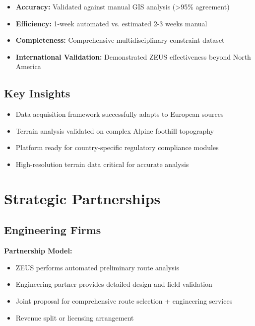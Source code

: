 \documentclass[11pt,letterpaper]{article}
\begin{document}
\begin{itemize}[leftmargin=*]
    \item \textbf{Accuracy:} Validated against manual GIS analysis (>95\% agreement)
    \item \textbf{Efficiency:} 1-week automated vs. estimated 2-3 weeks manual
    \item \textbf{Completeness:} Comprehensive multidisciplinary constraint dataset
    \item \textbf{International Validation:} Demonstrated ZEUS effectiveness beyond North America
\end{itemize}

\subsection{Key Insights}

\begin{itemize}[leftmargin=*]
    \item Data acquisition framework successfully adapts to European sources
    \item Terrain analysis validated on complex Alpine foothill topography
    \item Platform ready for country-specific regulatory compliance modules
    \item High-resolution terrain data critical for accurate analysis
\end{itemize}

\newpage

\section{Strategic Partnerships}

\subsection{Engineering Firms}

\textbf{Partnership Model:}
\begin{itemize}[leftmargin=*]
    \item ZEUS performs automated preliminary route analysis
    \item Engineering partner provides detailed design and field validation
    \item Joint proposal for comprehensive route selection + engineering services
    \item Revenue split or licensing arrangement
\end{itemize}
\end{document}
